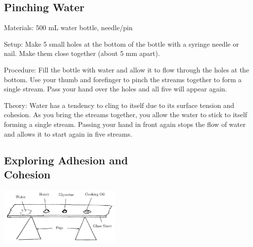 \begin{multicols}{2}
\subsection{Pinching Water}
\begin{description*}
\item[Materials:]{500 mL water bottle, needle/pin}
\item[Setup:]{Make 5 small holes at the bottom of the bottle with a syringe needle or nail. Make them close together (about 5 mm apart).}
\item[Procedure:]{Fill the bottle with water and allow it to flow through the holes at the bottom. Use your thumb and forefinger to pinch the streams together to form a single stream. Pass your hand over the holes and all five will appear again.}
\item[Theory:]{Water has a tendency to cling to itself due to its surface tension and cohesion. As you bring the streams together, you allow the water to stick to itself forming a single stream. Passing your hand in front again stops the flow of water and allows it to start again in five streams.}
\end{description*}

\columnbreak

\subsection[Exploring Adhesion and Cohesion]{Exploring Adhesion and \hfill \\ Cohesion}

\begin{center}
\includegraphics[width=0.45\textwidth]{./img/adhesion-cohesion.png}
\end{center}


\end{multicols}
